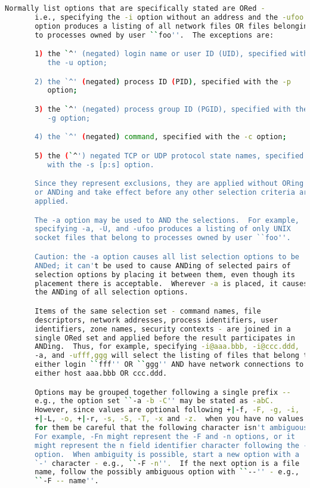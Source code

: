 {{\begin{lstlisting}[language=bash]
       Normally list options that are specifically stated are ORed -
       i.e., specifying the -i option without an address and the -ufoo
       option produces a listing of all network files OR files belonging
       to processes owned by user ``foo''.  The exceptions are:

       1) the `^' (negated) login name or user ID (UID), specified with
          the -u option;

       2) the `^' (negated) process ID (PID), specified with the -p
          option;

       3) the `^' (negated) process group ID (PGID), specified with the
          -g option;

       4) the `^' (negated) command, specified with the -c option;

       5) the (`^') negated TCP or UDP protocol state names, specified
          with the -s [p:s] option.

       Since they represent exclusions, they are applied without ORing
       or ANDing and take effect before any other selection criteria are
       applied.

       The -a option may be used to AND the selections.  For example,
       specifying -a, -U, and -ufoo produces a listing of only UNIX
       socket files that belong to processes owned by user ``foo''.

       Caution: the -a option causes all list selection options to be
       ANDed; it can't be used to cause ANDing of selected pairs of
       selection options by placing it between them, even though its
       placement there is acceptable.  Wherever -a is placed, it causes
       the ANDing of all selection options.

       Items of the same selection set - command names, file
       descriptors, network addresses, process identifiers, user
       identifiers, zone names, security contexts - are joined in a
       single ORed set and applied before the result participates in
       ANDing.  Thus, for example, specifying -i@aaa.bbb, -i@ccc.ddd,
       -a, and -ufff,ggg will select the listing of files that belong to
       either login ``fff'' OR ``ggg'' AND have network connections to
       either host aaa.bbb OR ccc.ddd.

       Options may be grouped together following a single prefix --
       e.g., the option set ``-a -b -C'' may be stated as -abC.
       However, since values are optional following +|-f, -F, -g, -i,
       +|-L, -o, +|-r, -s, -S, -T, -x and -z.  when you have no values
       for them be careful that the following character isn't ambiguous.
       For example, -Fn might represent the -F and -n options, or it
       might represent the n field identifier character following the -F
       option.  When ambiguity is possible, start a new option with a
       `-' character - e.g., ``-F -n''.  If the next option is a file
       name, follow the possibly ambiguous option with ``--'' - e.g.,
       ``-F -- name''.


\end{lstlisting}}}
